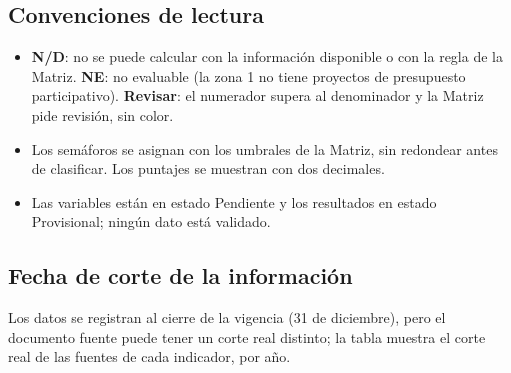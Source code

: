 \documentclass[11pt,letterpaper]{article}
\begin{document}
\subsection{Convenciones de lectura}
\begin{itemize}
\item \textbf{N/D}: no se puede calcular con la información disponible o con la regla de la Matriz. \textbf{NE}: no evaluable (la zona 1 no tiene proyectos de presupuesto participativo). \textbf{Revisar}: el numerador supera al denominador y la Matriz pide revisión, sin color.
\item Los semáforos se asignan con los umbrales de la Matriz, sin redondear antes de clasificar. Los puntajes se muestran con dos decimales.
\item Las variables están en estado Pendiente y los resultados en estado Provisional; ningún dato está validado.
\end{itemize}

\subsection{Fecha de corte de la información}

Los datos se registran al cierre de la vigencia (31 de diciembre), pero el documento fuente puede tener un corte real distinto; la tabla muestra el corte real de las fuentes de cada indicador, por año.
\end{document}
